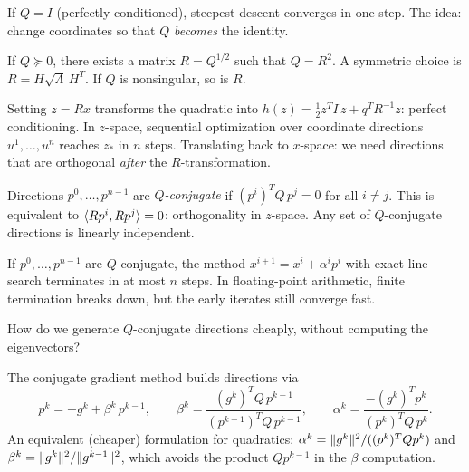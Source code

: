 If $Q = I$ (perfectly conditioned), steepest descent converges in one step.
The idea: change coordinates so that $Q$ \emph{becomes} the identity.

\begin{theorem}\label{thm:sqrt-decomp}
	If $Q \succeq 0$, there exists a matrix $R = Q^{1/2}$ such that $Q = R^2$.
	A symmetric choice is $R = H \sqrt{\Lambda}\, H^T$.
	If $Q$ is nonsingular, so is $R$.
\end{theorem}

Setting $z = Rx$ transforms the quadratic into $h(z) = \frac{1}{2} z^T I\, z + q^T R^{-1} z$: perfect conditioning.
In $z$-space, sequential optimization over coordinate directions $u^1, \dots, u^n$ reaches $z_*$ in $n$ steps.
Translating back to $x$-space: we need directions that are orthogonal \emph{after} the $R$-transformation.

\begin{definition}\label{def:q-conjugate}
	Directions $p^0, \dots, p^{n-1}$ are \textit{$Q$-conjugate} if $(p^i)^T Q\, p^j = 0$ for all $i \neq j$.
	This is equivalent to $\langle Rp^i, Rp^j\rangle = 0$: orthogonality in $z$-space.
	Any set of $Q$-conjugate directions is linearly independent.
\end{definition}

\begin{theorem}\label{thm:cg-finite}
	If $p^0, \dots, p^{n-1}$ are $Q$-conjugate, the method $x^{i+1} = x^i + \alpha^i p^i$ with exact line search terminates in at most $n$ steps.
	In floating-point arithmetic, finite termination breaks down, but the early iterates still converge fast.
\end{theorem}

How do we generate $Q$-conjugate directions cheaply, without computing the eigenvectors?

\begin{definition}\label{def:fletcher-reeves}
	The conjugate gradient method builds directions via
	\begin{equation}\label{eq:fletcher-reeves}
		p^k = -g^k + \beta^k\, p^{k-1},
		\qquad
		\beta^k = \frac{(g^k)^T Q\, p^{k-1}}{(p^{k-1})^T Q\, p^{k-1}},
		\qquad
		\alpha^k = \frac{-(g^k)^T p^k}{(p^k)^T Q\, p^k}.
	\end{equation}
	An equivalent (cheaper) formulation for quadratics:
	$\alpha^k = \lVert g^k\rVert^2 / ((p^k)^T Q p^k)$ and $\beta^k = \lVert g^k\rVert^2 / \lVert g^{k-1}\rVert^2$,
	which avoids the product $Q p^{k-1}$ in the $\beta$ computation.
\end{definition}

